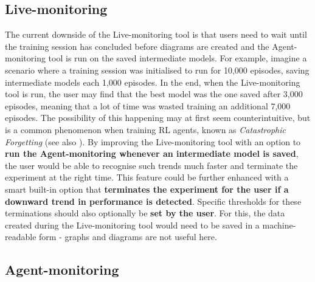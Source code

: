 \subsection{Live-monitoring}\label{subsec:FutureLiveMonitoring}

The current downside of the Live-monitoring tool is that users need to wait until the training session has concluded before diagrams are created and the Agent-monitoring tool is run on the saved intermediate models.
For example, imagine a scenario where a training session was initialised to run for 10,000 episodes, saving intermediate models each 1,000 episodes. In the end, when the Live-monitoring tool is run, the user may find that the best model was the one saved after 3,000 episodes, meaning that a lot of time was wasted training an additional 7,000 episodes. The possibility of this happening may at first seem counterintuitive, but is a common phenomenon when training RL agents, known as \emph{Catastrophic Forgetting} (see also \cite{CatastrophicForgetting}). By improving the Live-monitoring tool with an option to \textbf{run the Agent-monitoring whenever an intermediate model is saved}, the user would be able to recognise such trends much faster and terminate the experiment at the right time. This feature could be further enhanced with a smart built-in option that \textbf{terminates the experiment for the user if a downward trend in performance is detected}. Specific thresholds for these terminations should also optionally be \textbf{set by the user}. For this, the data created during the Live-monitoring tool would need to be saved in a machine-readable form - graphs and diagrams are not useful here.

\subsection{Agent-monitoring}\label{subsec:FutureAgentMonitoring}

